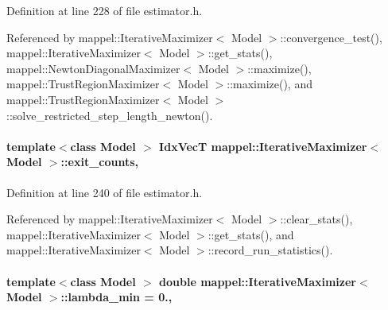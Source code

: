 Definition at line 228 of file estimator.\+h.



Referenced by mappel\+::\+Iterative\+Maximizer$<$ Model $>$\+::convergence\+\_\+test(), mappel\+::\+Iterative\+Maximizer$<$ Model $>$\+::get\+\_\+stats(), mappel\+::\+Newton\+Diagonal\+Maximizer$<$ Model $>$\+::maximize(), mappel\+::\+Trust\+Region\+Maximizer$<$ Model $>$\+::maximize(), and mappel\+::\+Trust\+Region\+Maximizer$<$ Model $>$\+::solve\+\_\+restricted\+\_\+step\+\_\+length\+\_\+newton().

\paragraph[{\texorpdfstring{exit\+\_\+counts}{exit_counts}}]{\setlength{\rightskip}{0pt plus 5cm}template$<$class Model $>$ {\bf Idx\+VecT} {\bf mappel\+::\+Iterative\+Maximizer}$<$ Model $>$\+::exit\+\_\+counts\hspace{0.3cm}{\ttfamily [protected]}, {\ttfamily [inherited]}}\hypertarget{classmappel_1_1IterativeMaximizer_a8a3554d07f510ab9e68d884307f937cc}{}\label{classmappel_1_1IterativeMaximizer_a8a3554d07f510ab9e68d884307f937cc}


Definition at line 240 of file estimator.\+h.



Referenced by mappel\+::\+Iterative\+Maximizer$<$ Model $>$\+::clear\+\_\+stats(), mappel\+::\+Iterative\+Maximizer$<$ Model $>$\+::get\+\_\+stats(), and mappel\+::\+Iterative\+Maximizer$<$ Model $>$\+::record\+\_\+run\+\_\+statistics().

\paragraph[{\texorpdfstring{lambda\+\_\+min}{lambda_min}}]{\setlength{\rightskip}{0pt plus 5cm}template$<$class Model $>$ double {\bf mappel\+::\+Iterative\+Maximizer}$<$ Model $>$\+::lambda\+\_\+min = 0.\hspace{0.3cm}{\ttfamily [protected]}, {\ttfamily [inherited]}}\hypertarget{classmappel_1_1IterativeMaximizer_a871576ad8b418a1f05df6a9eba2c60ab}{}\label{classmappel_1_1IterativeMaximizer_a871576ad8b418a1f05df6a9eba2c60ab}


